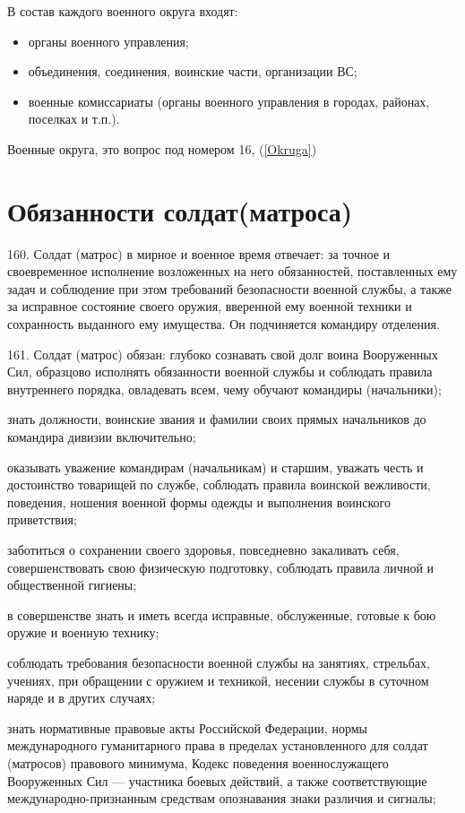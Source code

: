 \documentclass[12pt,a4paper]{report}
\begin{document}
В состав каждого военного округа входят:
\begin{itemize}


\item органы военного управления;
\item объединения, соединения, воинские части, организации ВС;
\item военные комиссариаты (органы военного управления в городах, районах, поселках и т.п.).
\end{itemize}
Военные округа, это вопрос под номером 16, (\ref{Okruga})



\section{Обязанности солдат(матроса)}
160. Солдат (матрос) в мирное и военное время отвечает: за точное и своевременное исполнение возложенных на него обязанностей, поставленных ему задач и соблюдение при этом требований безопасности военной службы, а также за исправное состояние своего оружия, вверенной ему военной техники и сохранность выданного ему имущества. Он подчиняется командиру отделения.

161. Солдат (матрос) обязан:
глубоко сознавать свой долг воина Вооруженных Сил, образцово исполнять обязанности военной службы и соблюдать правила внутреннего порядка, овладевать всем, чему обучают командиры (начальники);

знать должности, воинские звания и фамилии своих прямых начальников до командира дивизии включительно;

оказывать уважение командирам (начальникам) и старшим, уважать честь и достоинство товарищей по службе, соблюдать правила воинской вежливости, поведения, ношения военной формы одежды и выполнения воинского приветствия;

заботиться о сохранении своего здоровья, повседневно закаливать себя, совершенствовать свою физическую подготовку, соблюдать правила личной и общественной гигиены;

в совершенстве знать и иметь всегда исправные, обслуженные, готовые к бою оружие и военную технику;

соблюдать требования безопасности военной службы на занятиях, стрельбах, учениях, при обращении с оружием и техникой, несении службы в суточном наряде и в других случаях;

знать нормативные правовые акты Российской Федерации, нормы международного гуманитарного права в пределах установленного для солдат (матросов) правового минимума, Кодекс поведения военнослужащего Вооруженных Сил — участника боевых действий, а также соответствующие международно-признанным средствам опознавания знаки различия и сигналы;
\end{document}
